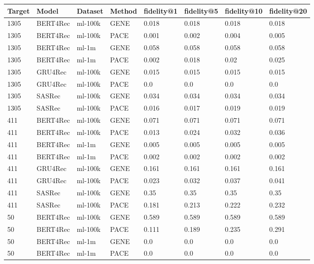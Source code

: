 \begingroup
    \setlength{\tabcolsep}{6pt} %
    \renewcommand{\arraystretch}{1.2} %
    \small %
    \begin{longtable}{|l|l|l|l|l|l|l|l|}
    \hline
\textbf{Target} & \textbf{Model} & \textbf{Dataset} & \textbf{Method} & \textbf{fidelity@1} & \textbf{fidelity@5} & \textbf{fidelity@10} & \textbf{fidelity@20} \\ \hline
\endhead
1305 & BERT4Rec & ml-100k & GENE & 0.018 & 0.018 & 0.018 & 0.018 \\
1305 & BERT4Rec & ml-100k & PACE & 0.001 & 0.002 & 0.004 & 0.005 \\\hline
1305 & BERT4Rec & ml-1m & GENE & 0.058 & 0.058 & 0.058 & 0.058 \\
1305 & BERT4Rec & ml-1m & PACE & 0.002 & 0.018 & 0.02 & 0.025 \\\hline
1305 & GRU4Rec & ml-100k & GENE & 0.015 & 0.015 & 0.015 & 0.015 \\
1305 & GRU4Rec & ml-100k & PACE & 0.0 & 0.0 & 0.0 & 0.0 \\\hline
1305 & SASRec & ml-100k & GENE & 0.034 & 0.034 & 0.034 & 0.034 \\
1305 & SASRec & ml-100k & PACE & 0.016 & 0.017 & 0.019 & 0.019 \\\hline
411 & BERT4Rec & ml-100k & GENE & 0.071 & 0.071 & 0.071 & 0.071 \\
411 & BERT4Rec & ml-100k & PACE & 0.013 & 0.024 & 0.032 & 0.036 \\\hline
411 & BERT4Rec & ml-1m & GENE & 0.005 & 0.005 & 0.005 & 0.005 \\
411 & BERT4Rec & ml-1m & PACE & 0.002 & 0.002 & 0.002 & 0.002 \\\hline
411 & GRU4Rec & ml-100k & GENE & 0.161 & 0.161 & 0.161 & 0.161 \\
411 & GRU4Rec & ml-100k & PACE & 0.023 & 0.032 & 0.037 & 0.041 \\\hline
411 & SASRec & ml-100k & GENE & 0.35 & 0.35 & 0.35 & 0.35 \\
411 & SASRec & ml-100k & PACE & 0.181 & 0.213 & 0.222 & 0.232 \\\hline
50 & BERT4Rec & ml-100k & GENE & 0.589 & 0.589 & 0.589 & 0.589 \\
50 & BERT4Rec & ml-100k & PACE & 0.111 & 0.189 & 0.235 & 0.291 \\\hline
50 & BERT4Rec & ml-1m & GENE & 0.0 & 0.0 & 0.0 & 0.0 \\
50 & BERT4Rec & ml-1m & PACE & 0.0 & 0.0 & 0.0 & 0.0 \\\hline

\end{longtable}
